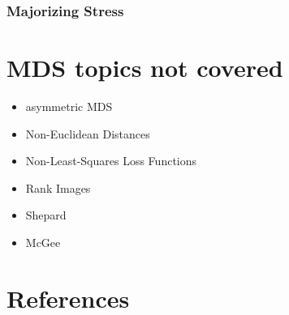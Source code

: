 \documentclass[
  12pt,
]{article}
\providecommand{\tightlist}{%
  \setlength{\itemsep}{0pt}\setlength{\parskip}{0pt}}
\begin{document}
\subsubsection{Majorizing Stress}\label{majorizing-stress}

\section{MDS topics not covered}\label{mds-topics-not-covered}

\begin{itemize}
\tightlist
\item
  asymmetric MDS
\item
  Non-Euclidean Distances
\item
  Non-Least-Squares Loss Functions
\item
  Rank Images
\item
  Shepard
\item
  McGee
\end{itemize}

\section*{References}\label{references}
\end{document}
